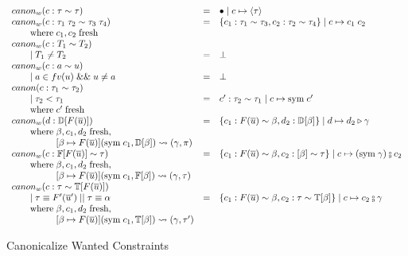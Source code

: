 \begin{figure}
\[
\begin{array}{l c l}
canon_w(c : \tau \sim \tau) &=& \bullet \mid c \mapsto \langle \tau \rangle
\\
canon_w(c : \tau_1 \; \tau_2 \sim \tau_3 \; \tau_4) &=& \{c_1 : \tau_1 \sim
\tau_3, c_2 : \tau_2  \sim \tau_4\} \mid c \mapsto c_1 \; c_2
\\ \where c_1, c_2 \; \text{fresh}
\\
canon_w(c : T_1 \sim T_2)
\\ \guard T_1 \neq T_2 &=& \bot
\\
canon_w(c : a \sim u)
\\ \guard a \in fv(u) \; \&\& \; u \neq a &=& \bot
\\
canon (c : \tau_1 \sim \tau_2)
\\ \qquad \mid \tau_2 < \tau_1 &=& c' : \tau_2 \sim \tau_1 \mid c \mapsto \text{sym}
\; c'
\\ \where c' \; \text{fresh}
\\
canon_w(d : \mathbb{D}[F(\overline{u})]) &=& \{ c_1 : F(\overline{u}) \sim \beta,
d_2 : \mathbb{D}[\beta]\} \mid d \mapsto d_2 \triangleright \gamma
\\ \where \beta, c_1, d_2 \; \text{fresh},
\\ \whereindent [\beta \mapsto F(\overline{u})](\text{sym} \; c_1, \mathbb{D}[\beta])
\rightsquigarrow (\gamma, \pi)
\\
canon_w(c : \mathbb{F}[F(\overline{u})] \sim \tau) &=& \{c_1 : F(\overline{u})
\sim \beta, c_2 : \mathbb[\beta] \sim \tau \} \mid c \mapsto (\text{sym} \; \gamma)
\fctrans c_2
\\ \where \beta, c_1, d_2 \; \text{fresh},
\\ \whereindent [\beta \mapsto F(\overline{u})](\text{sym} \; c_1,
\mathbb{F}[\beta]) \rightsquigarrow (\gamma, \tau)
\\
canon_w(c : \tau \sim \mathbb{T}[F(\overline{u})])
\\ \qquad \mid \tau \equiv F'(\overline{u}') \; || \; \tau \equiv \alpha &=&
\{c_1 : F(\overline{u}) \sim \beta, c_2 : \tau \sim \mathbb{T}[\beta]\} \mid c
\mapsto c_2 \fctrans \gamma
\\ \where \beta, c_1, d_2 \; \text{fresh},
\\ \whereindent [\beta \mapsto F(\overline{u})](\text{sym} \; c_1,
\mathbb{T}[\beta]) \rightsquigarrow (\gamma, \tau')
\end{array}
\]
\caption{Canonicalize Wanted Constraints}
\end{figure}


